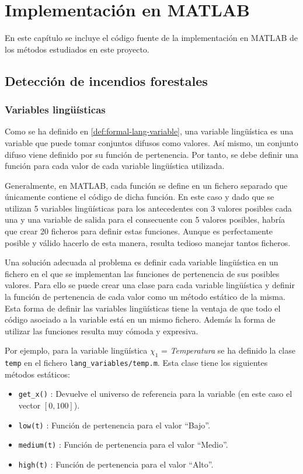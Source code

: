 \chapter{Implementación en MATLAB}
En este capítulo se incluye el código fuente de la implementación en MATLAB de los métodos estudiados en este proyecto.

\section{Detección de incendios forestales}
\subsection{Variables lingüísticas}
Como se ha definido en \ref{def:formal-lang-variable}, una variable lingüística es una variable que puede tomar conjuntos difusos como valores. Así mismo, un conjunto difuso viene definido por su función de pertenencia. Por tanto, se debe definir una función para cada valor de cada variable lingüística utilizada. 

Generalmente, en MATLAB, cada función se define en un fichero separado que únicamente contiene el código de dicha función. En este caso y dado que se utilizan 5 variables lingüísticas para los antecedentes con 3 valores posibles cada una y una variable de salida para el consecuente con 5 valores posibles, habría que crear 20 ficheros para definir estas funciones. Aunque es perfectamente posible y válido hacerlo de esta manera, resulta tedioso manejar tantos ficheros. 

Una solución adecuada al problema es definir cada variable lingüística en un fichero en el que se implementan las funciones de pertenencia de sus posibles valores. Para ello se puede crear una clase para cada variable lingüística y definir la función de pertenencia de cada valor como un método estático de la misma. Esta forma de definir las variables lingüísticas tiene la ventaja de que todo el código asociado a la variable está en un mismo fichero. Además la forma de utilizar las funciones resulta muy cómoda y expresiva.

Por ejemplo, para la variable lingüística $\chi_1$ = \emph{Temperatura} se ha definido la clase \lstinline|temp| en el fichero \lstinline|lang_variables/temp.m|. Esta clase tiene los siguientes métodos estáticos:
\begin{itemize}
\item \lstinline|get_x()| : Devuelve el universo de referencia para la variable (en este caso el vector $[0,100]$).
\item \lstinline|low(t)| : Función de pertenencia para el valor ``Bajo''.
\item \lstinline|medium(t)| : Función de pertenencia para el valor ``Medio''.
\item \lstinline|high(t)| : Función de pertenencia para el valor ``Alto''.
\end{itemize}

